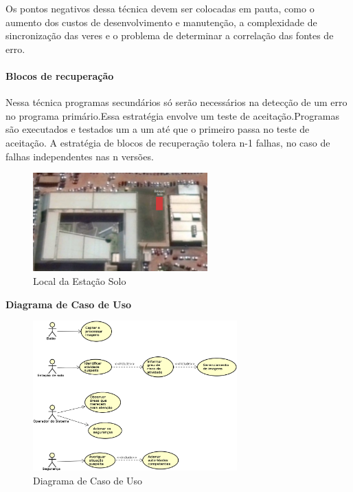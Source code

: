 Os pontos negativos dessa técnica devem ser colocadas em pauta, como o aumento dos custos de desenvolvimento e manutenção, a complexidade de sincronização das veres e o problema de determinar a correlação das fontes de erro.

\paragraph{Blocos de recuperação}

Nessa técnica programas secundários só serão necessários na detecção de um erro no programa primário.Essa estratégia envolve um teste de aceitação.Programas são executados e testados um a um até que o primeiro passa no teste de aceitação. A estratégia de blocos de recuperação tolera n-1 falhas, no caso de falhas independentes nas n versões.

\begin{figure}[H]
	\centering
	\includegraphics[width=0.6\textwidth]{figuras/estacaoSolo}
	\caption{Local da Estação Solo}
	\label{img:estacaoSoloLocal}
\end{figure}

\textbf{Diagrama de Caso de Uso}

\begin{figure}[H]
	\centering
	\includegraphics[width=0.7\textwidth]{figuras/Casosdeuso}
	\caption{Diagrama de Caso de Uso}
	\label{img:Casos de Uso}
\end{figure}

